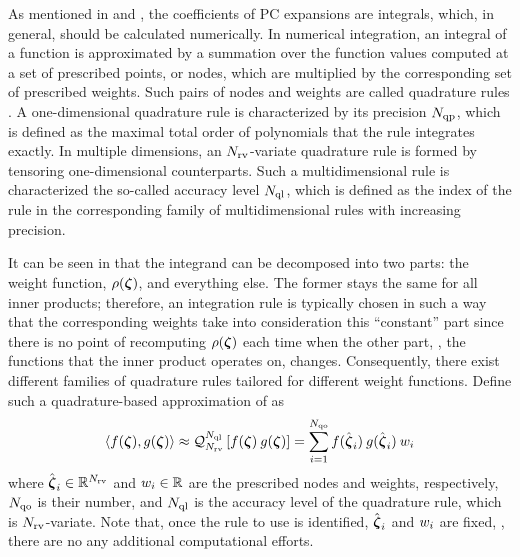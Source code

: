 As mentioned in  and , the coefficients of PC expansions are integrals, which, in general, should be calculated numerically. In numerical integration, an integral of a function is approximated by a summation over the function values computed at a set of prescribed points, or nodes, which are multiplied by the corresponding set of prescribed weights. Such pairs of nodes and weights are called quadrature rules \cite{press2007}. A one-dimensional quadrature rule is characterized by its precision $N_\text{qp}$, which is defined as the maximal total order of polynomials that the rule integrates exactly. In multiple dimensions, an ${N_\text{rv}}$-variate quadrature rule is formed by tensoring one-dimensional counterparts. Such a multidimensional rule is characterized the so-called accuracy level $N_\text{ql}$, which is defined as the index of the rule in the corresponding family of multidimensional rules with increasing precision.

It can be seen in  that the integrand can be decomposed into two parts: the weight function, $\rho(\boldsymbol{\zeta})$, and everything else. The former stays the same for all inner products; therefore, an integration rule is typically chosen in such a way that the corresponding weights take into consideration this ``constant'' part since there is no point of recomputing $\rho(\boldsymbol{\zeta})$ each time when the other part, \ie, the functions that the inner product operates on, changes. Consequently, there exist different families of quadrature rules tailored for different weight functions. Define such a quadrature-based approximation of  as
\[
  \oInner{f(\vz)}{g(\vz)} \approx \oQuad{\vars}{\qdlevel}{f(\vz) \: g(\vz)} = \sum_{i = 1}^{\qdorder} f(\qdn{\vz}_i) \: g(\qdn{\vz}_i) \: \qdw_i
\]
where $\hat{\boldsymbol{\zeta}}_i \in \mathbb{R}^{N_\text{rv}}$ and $w_i \in \mathbb{R}$ are the prescribed nodes and weights, respectively, $N_\text{qo}$ is their number, and $N_\text{ql}$ is the accuracy level of the quadrature rule, which is ${N_\text{rv}}$-variate. Note that, once the rule to use is identified, $\hat{\boldsymbol{\zeta}}_i$ and $w_i$ are fixed, \ie, there are no any additional computational efforts.

